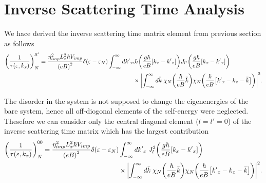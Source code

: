\section{Inverse Scattering Time Analysis}

We hace derived the inverse scattering time matrix element from previous section as follows
\begin{equation} \label{5.1}
  \begin{aligned}
    \qty(\frac{1}{\tau(\varepsilon,k_x)})^{ll'}_{N} =
    \frac { \eta_{imp}^2 L_x^2 \hbar V_{imp}}{\qty(eB)^2}
    \delta(\varepsilon - \varepsilon_{N})
    \int_{-\infty}^{\infty} d {k'}_x
    &
    J_l\qty(\frac{g\hbar}{eB}[{k}_x - {k'}_x])
    J_{l'}\qty(\frac{g\hbar}{eB}[{k}_x - {k'}_x]) \\
    & \times
    \qty|
    \int_{-\infty}^{\infty} d\bar{k} \;
    {\chi}_{N}\qty(\frac{\hbar}{eB}\bar{k})
    {\chi}_{N}\qty(\frac{\hbar}{eB} \qty[{k'}_x - {k}_x - \bar{k}])|^2.
  \end{aligned}
\end{equation}

\noindent
The disorder in the system is not supposed to change the eigenenergies of the bare system, hence all off-diogonal elements of the self-energy were neglected. Thesefore we can consider only the central diagonal element (${l=l'=0}$) of the inverse scattering time matrix which has the largest contribution
\begin{equation} \label{5.2}
  \begin{aligned}
    \qty(\frac{1}{\tau(\varepsilon,k_x)})^{00}_{N} =
    \frac { \eta_{imp}^2 L_x^2 \hbar V_{imp}}{\qty(eB)^2}
    \delta(\varepsilon - \varepsilon_{N}) &
    \int_{-\infty}^{\infty} d {k'}_x \;
    J_l^2\qty(\frac{g\hbar}{eB}[{k}_x - {k'}_x])
    \\
    & \times
    \qty|
    \int_{-\infty}^{\infty} d\bar{k} \;
    {\chi}_{N}\qty(\frac{\hbar}{eB}\bar{k})
    {\chi}_{N}\qty(\frac{\hbar}{eB} \qty[{k'}_x - {k}_x - \bar{k}])|^2.
  \end{aligned}
\end{equation}

